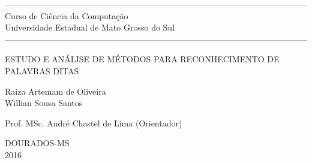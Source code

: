 \thispagestyle{empty}
\begin{center}

------------------------------------------------------------------------------------------------------------
\normalsize{Curso de Ciência da Computação \\ Universidade Estadual de Mato Grosso do Sul}
------------------------------------------------------------------------------------------------------------

\vspace*{3cm}

\Large{ESTUDO E ANÁLISE DE MÉTODOS PARA RECONHECIMENTO DE PALAVRAS DITAS}


\vspace*{3cm}
\normalsize{Raiza Artemam de Oliveira \\ Willian Sousa Santos}

\vspace*{2cm}

\normalsize{Prof. MSc. André Chastel de Lima (Orientador)}

\vspace*{6cm}


\large{DOURADOS-MS \\ 2016}
\end{center}